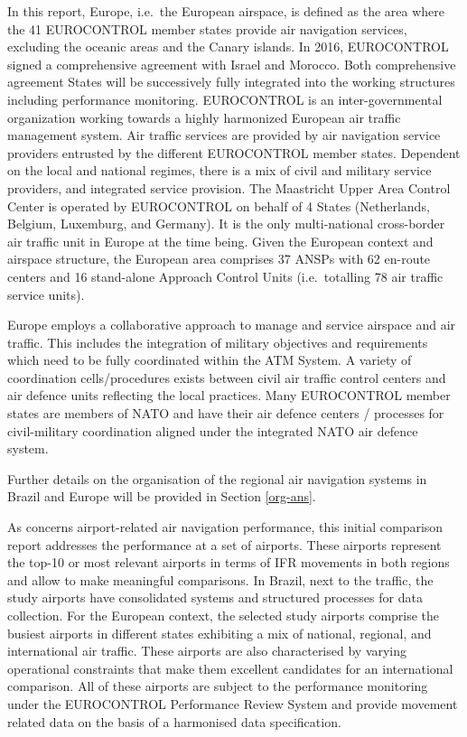 \documentclass[
]{book}
\begin{document}
In this report, Europe, i.e.~the European airspace, is defined as the area where the 41 EUROCONTROL member states provide air navigation services, excluding the oceanic areas and the Canary islands.
In 2016, EUROCONTROL signed a comprehensive agreement with Israel and Morocco.
Both comprehensive agreement States will be successively fully integrated into the working structures including performance monitoring.
EUROCONTROL is an inter-governmental organization working towards a highly harmonized European air traffic management system.
Air traffic services are provided by air navigation service providers entrusted by the different EUROCONTROL member states.
Dependent on the local and national regimes, there is a mix of civil and military service providers, and integrated service provision.
The Maastricht Upper Area Control Center is operated by EUROCONTROL on behalf of 4 States (Netherlands, Belgium, Luxemburg, and Germany). It is the only multi-national cross-border air traffic unit in Europe at the time being.
Given the European context and airspace structure, the European area comprises 37 ANSPs with 62 en-route centers and 16 stand-alone Approach Control Units (i.e.~totalling 78 air traffic service units).

Europe employs a collaborative approach to manage and service airspace and air traffic.
This includes the integration of military objectives and requirements which need to be fully coordinated within the ATM System.
A variety of coordination cells/procedures exists between civil air traffic control centers and air defence units reflecting the local practices.
Many EUROCONTROL member states are members of NATO and have their air defence centers / processes for civil-military coordination aligned under the integrated NATO air defence system.

Further details on the organisation of the regional air navigation systems in Brazil and Europe will be provided in Section \ref{org-ans}.

As concerns airport-related air navigation performance, this initial comparison report addresses the performance at a set of airports.
These airports represent the top-10 or most relevant airports in terms of IFR movements in both regions and allow to make meaningful comparisons.
In Brazil, next to the traffic, the study airports have consolidated systems and structured processes for data collection.
For the European context, the selected study airports comprise the busiest airports in different states exhibiting a mix of national, regional, and international air traffic.
These airports are also characterised by varying operational constraints that make them excellent candidates for an international comparison.
All of these airports are subject to the performance monitoring under the EUROCONTROL Performance Review System and provide movement related data on the basis of a harmonised data specification.
\end{document}
